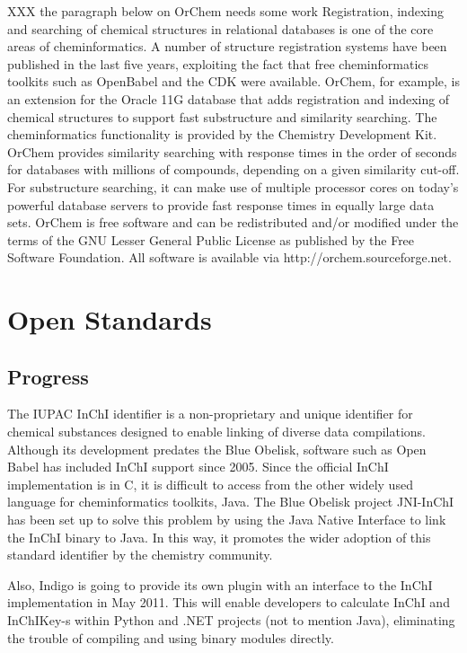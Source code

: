 \documentclass[10pt]{bmc_article}
\newenvironment{bmcformat}{\fussy\setboolean{publ}{true}}{\fussy}
\begin{document}
\begin{bmcformat}
XXX the paragraph below on OrChem needs some work
Registration, indexing and searching of chemical structures in relational databases is one of the core areas of cheminformatics.
A number of structure registration systems have been published in the last five years, exploiting the fact that
free cheminformatics toolkits such as OpenBabel and the CDK were available.
OrChem, for example, is an extension for the Oracle 11G database that adds registration and indexing of chemical structures to support fast substructure and similarity searching. The cheminformatics functionality is provided by the Chemistry Development Kit. OrChem provides similarity searching with response times in the order of seconds for databases with millions of compounds, depending on a given similarity cut-off. For substructure searching, it can make use of multiple processor cores on today's powerful database servers to provide fast response times in equally large data sets.
OrChem is free software and can be redistributed and/or modified under the terms of the GNU Lesser General Public License as published by the Free Software Foundation. All software is available via http://orchem.sourceforge.net.

\section*{Open Standards}
  \subsection*{Progress}

The IUPAC InChI identifier is a non-proprietary and unique identifier
for chemical substances designed to enable linking of diverse data
compilations. Although its development predates the Blue Obelisk,
software such as Open Babel has included InChI support since 2005.
Since the official InChI implementation is in C, it is difficult to
access from the other widely used language for cheminformatics
toolkits, Java. The Blue Obelisk project JNI-InChI has been set up to
solve this problem by using the Java Native Interface to link the
InChI binary to Java. In this way, it promotes the wider adoption of
this standard identifier by the chemistry community.

Also, Indigo is going to provide its own plugin with an interface to
the InChI implementation in May 2011. This will enable developers to
calculate InChI and InChIKey-s within Python and .NET projects (not to
mention Java), eliminating the trouble of compiling and using binary
modules directly.


\end{bmcformat}
\end{document}
